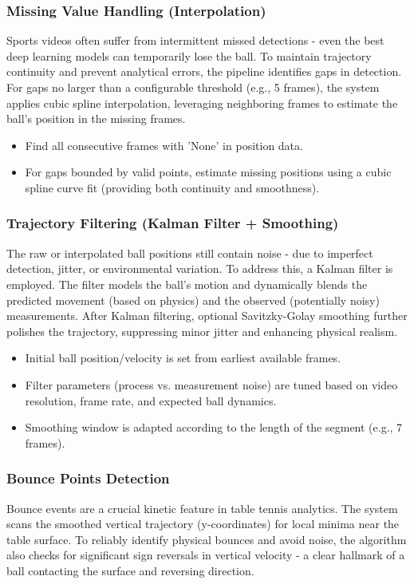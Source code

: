 \documentclass[conference]{IEEEtran}
\begin{document}
\subsubsection{Missing Value Handling (Interpolation)}
Sports videos often suffer from intermittent missed detections - even the best deep learning models can temporarily lose the ball. To maintain trajectory continuity and prevent analytical errors, the pipeline identifies gaps in detection. For gaps no larger than a configurable threshold (e.g., 5 frames), the system applies cubic spline interpolation, leveraging neighboring frames to estimate the ball's position in the missing frames.

\begin{itemize}
    \item Find all consecutive frames with 'None' in position data.
    \item For gaps bounded by valid points, estimate missing positions using a cubic spline curve fit (providing both continuity and smoothness).
\end{itemize}

\subsubsection{Trajectory Filtering (Kalman Filter + Smoothing)}
The raw or interpolated ball positions still contain noise - due to imperfect detection, jitter, or environmental variation. To address this, a Kalman filter is employed. The filter models the ball's motion and dynamically blends the predicted movement (based on physics) and the observed (potentially noisy) measurements. After Kalman filtering, optional Savitzky-Golay smoothing further polishes the trajectory, suppressing minor jitter and enhancing physical realism.

\begin{itemize}
    \item Initial ball position/velocity is set from earliest available frames.
    \item Filter parameters (process vs. measurement noise) are tuned based on video resolution, frame rate, and expected ball dynamics.
    \item Smoothing window is adapted according to the length of the segment (e.g., 7 frames).
\end{itemize}

\subsubsection{Bounce Points Detection}
Bounce events are a crucial kinetic feature in table tennis analytics. The system scans the smoothed vertical trajectory (y-coordinates) for local minima near the table surface. To reliably identify physical bounces and avoid noise, the algorithm also checks for significant sign reversals in vertical velocity - a clear hallmark of a ball contacting the surface and reversing direction.
\end{document}
